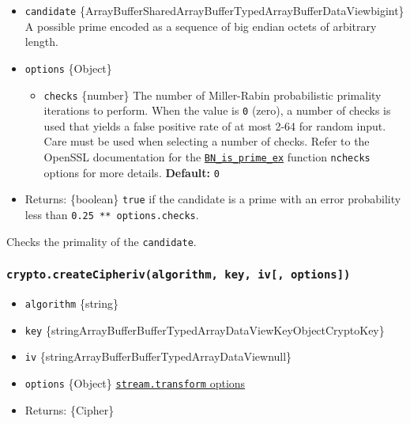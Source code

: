 \begin{itemize}
\tightlist
\item
  \texttt{candidate}
  \{ArrayBuffer\textbar SharedArrayBuffer\textbar TypedArray\textbar Buffer\textbar DataView\textbar bigint\}
  A possible prime encoded as a sequence of big endian octets of
  arbitrary length.
\item
  \texttt{options} \{Object\}

  \begin{itemize}
  \tightlist
  \item
    \texttt{checks} \{number\} The number of Miller-Rabin probabilistic
    primality iterations to perform. When the value is \texttt{0}
    (zero), a number of checks is used that yields a false positive rate
    of at most 2-64 for random input. Care must be used when selecting a
    number of checks. Refer to the OpenSSL documentation for the
    \href{https://www.openssl.org/docs/man1.1.1/man3/BN_is_prime_ex.html}{\texttt{BN\_is\_prime\_ex}}
    function \texttt{nchecks} options for more details.
    \textbf{Default:} \texttt{0}
  \end{itemize}
\item
  Returns: \{boolean\} \texttt{true} if the candidate is a prime with an
  error probability less than \texttt{0.25\ **\ options.checks}.
\end{itemize}

Checks the primality of the \texttt{candidate}.

\subsubsection{\texorpdfstring{\texttt{crypto.createCipheriv(algorithm,\ key,\ iv{[},\ options{]})}}{crypto.createCipheriv(algorithm, key, iv{[}, options{]})}}\label{crypto.createcipherivalgorithm-key-iv-options}

\begin{itemize}
\tightlist
\item
  \texttt{algorithm} \{string\}
\item
  \texttt{key}
  \{string\textbar ArrayBuffer\textbar Buffer\textbar TypedArray\textbar DataView\textbar KeyObject\textbar CryptoKey\}
\item
  \texttt{iv}
  \{string\textbar ArrayBuffer\textbar Buffer\textbar TypedArray\textbar DataView\textbar null\}
\item
  \texttt{options} \{Object\}
  \href{stream.md\#new-streamtransformoptions}{\texttt{stream.transform}
  options}
\item
  Returns: \{Cipher\}
\end{itemize}

